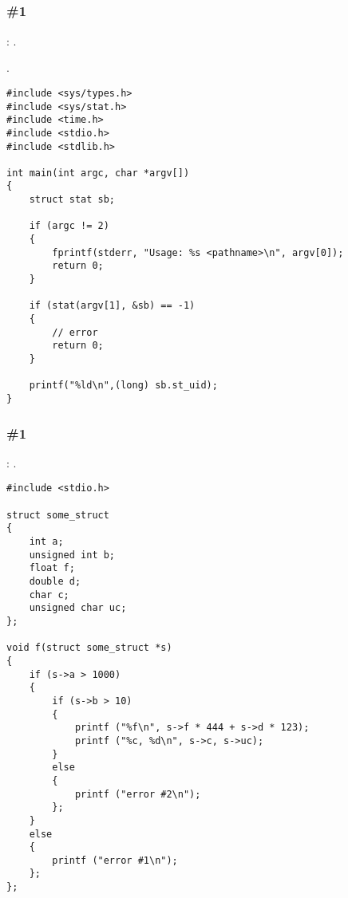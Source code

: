 \subsection{}

\subsubsection{\Exercise \#1}
\label{exercise_solutions_struct_1}

\Exercise: .

.

\begin{lstlisting}
#include <sys/types.h>
#include <sys/stat.h>
#include <time.h>
#include <stdio.h>
#include <stdlib.h>

int main(int argc, char *argv[])
{
    struct stat sb;

    if (argc != 2) 
    {
        fprintf(stderr, "Usage: %s <pathname>\n", argv[0]);
        return 0;
    }

    if (stat(argv[1], &sb) == -1) 
    {
    	// error
        return 0;
    }

    printf("%ld\n",(long) sb.st_uid);
}
\end{lstlisting}

\subsubsection{\Exercise \#1}
\label{exercise_solutions_struct_2}

\Exercise: .


\begin{lstlisting}
#include <stdio.h>

struct some_struct
{
	int a;
	unsigned int b;
	float f;
	double d;
	char c;
	unsigned char uc;
};

void f(struct some_struct *s)
{
	if (s->a > 1000)
	{
		if (s->b > 10)
		{
			printf ("%f\n", s->f * 444 + s->d * 123);
			printf ("%c, %d\n", s->c, s->uc);
		}
		else
		{
			printf ("error #2\n");
		};
	}
	else
	{
		printf ("error #1\n");
	};
};
\end{lstlisting}

